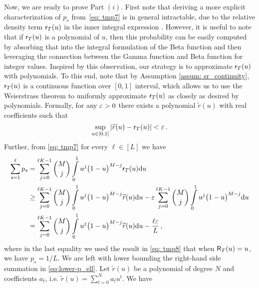 \documentclass[11pt]{article}
\begin{document}
Now, we are ready to prove Part $(i)$. First note that deriving a more explicit characterization of $p_s$ from~\eqref{eq: tmp7} is in general intractable, due to the relative density term $\mathsf{r}_{T}(u)$ in the inner integral expression . However, it is useful to note that if $\mathsf{r}_{T}(u)$ is a polynomial of $u$, then this probability can be easily computed by absorbing that into the integral formulation of the Beta function and then leveraging the connection between the Gamma function and Beta function for integer values.  Inspired by this observation, our strategy is to  approximate $\mathsf{r}_{T}(u)$ with polynomials.  To this end, note that by Assumption \ref{assum: sr_continuity}, $\mathsf{r}_{T}(u)$ is a continuous function over $[0,1]$ interval, which allows us to use the Weierstrass theorem to uniformly approximate $\mathsf{r}_T(u)$ as closely as desired by polynomials.  Formally, for any ${\varepsilon}>0$ there exists a polynomial $\widetilde{r}(u)$ with real coefficients such that 
%
\begin{equation}\label{eq: def-eps_i}
\sup\limits_{u\in [0,1]}^{} |\widetilde{r}(u)-\mathsf{r}_T(u)| <{\varepsilon} \,.
\end{equation}
Further, from \eqref{eq: tmp7} for every $\ell\in[L]$ we have
\begin{align}
	\sum\limits_{s=1}^{\ell}p_s&= \sum\limits_{j=0}^{\ell K-1} \binom{M}{j}\int\limits_{0}^{1}u^{j}\big(1-u\big)^{M-j}\mathsf{r}_{T}(u){\rm d} u\nonumber\\
	&\geq \sum\limits_{j=0}^{\ell K-1} \binom{M}{j}\int\limits_{0}^{1}u^{j}\big(1-u\big)^{M-j}\widetilde{r}(u){\rm d} u -{\varepsilon}  \sum\limits_{j=0}^{\ell K-1} \binom{M}{j}\int\limits_{0}^{1}u^{j}\big(1-u\big)^{M-j}{\rm d} u\nonumber\\
	&= \sum\limits_{j=0}^{ \ell K-1} \binom{M}{j}\int\limits_{0}^{1}u^{j}\big(1-u\big)^{M-j}\widetilde{r}(u){\rm d} u -\frac{\ell{\varepsilon}}{L}\label{eq:lower-p_ell}\,,
\end{align}
where in the last equality we used the result in \eqref{eq: tmp8} that when $\mathsf{R}_{T}(u)=u$, we have $p_{s}=1/L$. We are left with lower bounding the right-hand side summation in \eqref{eq:lower-p_ell}. Let $\widetilde{r}(u)$ be a polynomial of degree $N$ and coefficients $a_t$, i.e. $\widetilde{r}(u)=\sum\limits_{t=0}^{N}a_tu^t$. We have 
\end{document}
